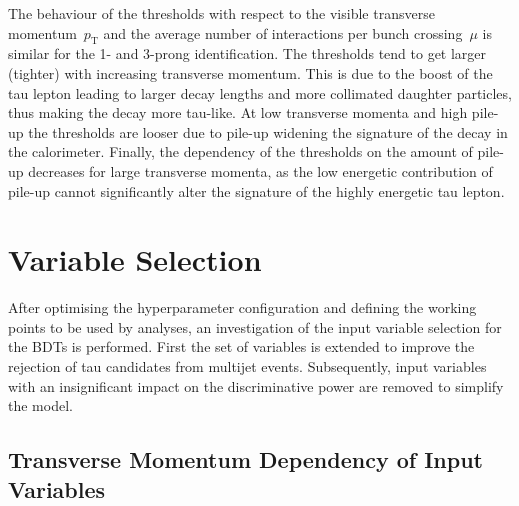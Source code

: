 The behaviour of the thresholds with respect to the visible transverse
momentum~$p_\text{T}$ and the average number of interactions per bunch
crossing~$\mu$ is similar for the 1- and 3-prong identification. The thresholds
tend to get larger (tighter) with increasing transverse momentum. This is due to
the boost of the tau lepton leading to larger decay lengths and more collimated
daughter particles, thus making the decay more tau-like. At low transverse
momenta and high pile-up the thresholds are looser due to pile-up widening the
signature of the decay in the calorimeter. Finally, the dependency of the
thresholds on the amount of pile-up decreases for large transverse momenta, as
the low energetic contribution of pile-up cannot significantly alter the
signature of the highly energetic tau lepton.

\section{Variable Selection}
\label{sec:bdt_variable_selection}

After optimising the hyperparameter configuration and defining the working
points to be used by analyses, an investigation of the input variable selection
for the BDTs is performed. First the set of variables is extended to improve the
rejection of tau candidates from multijet events. Subsequently, input variables
with an insignificant impact on the discriminative power are removed to simplify
the model.

\subsection{Transverse Momentum Dependency of Input Variables}
\label{sec:bdt_incl_pt}


